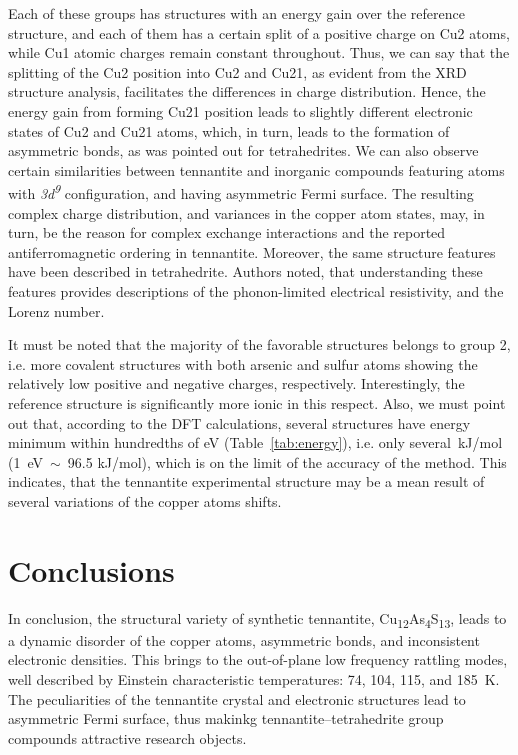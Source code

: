 \documentclass[preprint,review,12pt]{elsarticle}
\begin{document}
Each of these groups has structures with an energy gain over the reference structure, and each of them has a certain split of a positive charge on Cu2 atoms, while Cu1 atomic charges remain constant throughout.
Thus, we can say that the splitting of the Cu2 position into Cu2 and Cu21, as evident from the XRD structure analysis, facilitates the differences in charge distribution.
Hence, the energy gain from forming Cu21 position leads to slightly different electronic states of Cu2 and Cu21 atoms, which, in turn, leads to the formation of asymmetric bonds, as was pointed out for tetrahedrites\cite{Lai2015,Long2020}.
We can also observe certain similarities between tennantite and inorganic compounds featuring atoms with  {\it 3d\textsuperscript{9}}  configuration, and having asymmetric Fermi surface.
The resulting complex charge distribution, and variances in the copper atom states, may, in turn, be the reason for complex exchange interactions and the reported antiferromagnetic ordering\cite{yaroslavzev2019} in tennantite.
Moreover, the same structure features have been described in tetrahedrite\cite{DiPaola2020}.
Authors noted, that understanding these features provides descriptions of the phonon-limited electrical resistivity, and the Lorenz number.

It must be noted that the majority of the favorable structures belongs to group 2, i.e. more covalent structures with both arsenic and sulfur atoms showing the relatively low positive and negative charges, respectively.
Interestingly, the reference structure is significantly more ionic in this respect.
Also, we must point out that, according to the DFT calculations, several structures have energy minimum within hundredths of eV (Table~\ref{tab:energy}), i.e. only several~kJ/mol (1~eV~$\sim$~96.5 kJ/mol), which is on the limit of the accuracy of the method.
This indicates, that the tennantite experimental structure may be a mean result of several variations of the copper atoms shifts.


\section{Conclusions}\label{sec:level1}
In conclusion, the structural variety of synthetic tennantite, Cu\textsubscript{12}As\textsubscript{4}S\textsubscript{13},  leads to  a dynamic disorder of the copper atoms, asymmetric bonds, and inconsistent electronic densities.
This brings to the out-of-plane low frequency rattling modes, well described by Einstein characteristic temperatures: 74, 104, 115, and 185~K.
The peculiarities of the tennantite crystal and electronic structures lead to asymmetric Fermi surface, thus makinkg tennantite--tetrahedrite group compounds attractive research objects.
\end{document}
